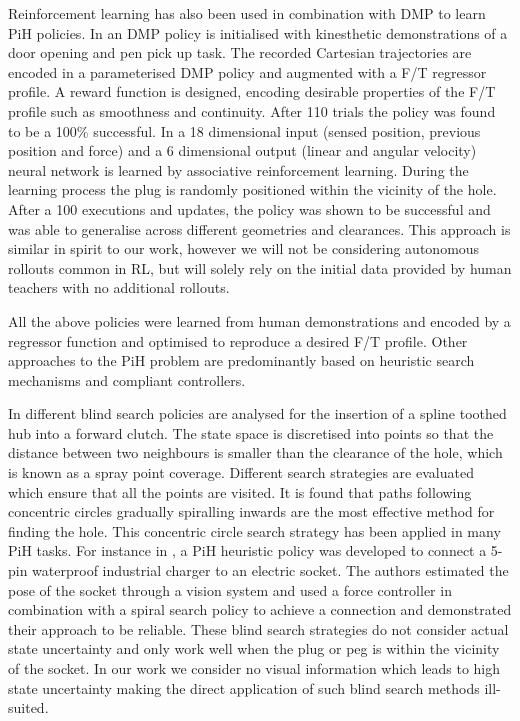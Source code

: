 Reinforcement learning has also been used in combination with DMP to learn PiH policies. In \cite{learn_force_c_icirs_2011}
an DMP policy is initialised with kinesthetic demonstrations of a door opening and pen pick up task. The recorded Cartesian 
trajectories are encoded in a parameterised DMP policy and augmented with a F/T regressor profile. A reward function is designed, 
encoding desirable properties of the F/T profile such as smoothness and continuity. After 110 trials the policy
was found to be a 100\% successful. In \cite{learn_admittance_icra_1994} a 18 dimensional input (sensed position, previous position and force) 
and a 6 dimensional output (linear and angular velocity) neural network is learned by associative reinforcement learning. 
During the learning process the plug is randomly positioned within the vicinity of the hole. After a 100 executions and 
updates, the policy was shown to be successful and was able to generalise across different geometries and clearances.
This approach is similar in spirit to our work, however we will not be considering autonomous rollouts common 
in RL, but will solely rely on the initial data provided by human teachers with no additional rollouts.

All the above policies were learned from human demonstrations and encoded by a regressor function and
optimised to reproduce a desired F/T profile. Other approaches to the PiH problem 
are predominantly based on heuristic search mechanisms and compliant controllers.

In \cite{search_strategies_icra_2001} different blind search policies are analysed for the insertion of a spline toothed hub 
into a forward clutch. The state space is discretised into points so that the distance between two 
neighbours is smaller than the clearance of the hole, which is known as a spray point coverage. Different search 
strategies are evaluated which ensure that all the points are visited. It is found that paths following  
concentric circles gradually spiralling inwards are the most effective method for finding the hole. This concentric circle
search strategy has been applied in many PiH tasks. For instance in \cite{peg_imcssd_2015}, a PiH heuristic 
policy was developed to connect a 5-pin waterproof industrial charger to an electric socket. The authors 
estimated the pose of the socket through a vision system and used a force controller in combination with a 
spiral search policy to achieve a connection and demonstrated their approach to be reliable. 
These blind search strategies do not consider actual state uncertainty and only work well when the plug or 
peg is within the vicinity of the socket. In our work we consider no visual information which leads to 
high state uncertainty making the direct application of such blind search methods ill-suited.

